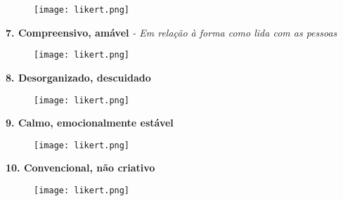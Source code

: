 \begin{figure}[!h]
\texttt{[image: likert.png]}
\end{figure}
 
\noindent
\textbf{7. Compreensivo, amável}       \footnotesize \textsl{- Em relação à forma como lida com as pessoas}\normalsize

\begin{figure}[!h]
\texttt{[image: likert.png]}
\end{figure}

\noindent
\textbf{8. Desorganizado, descuidado}

\begin{figure}[!h]
\texttt{[image: likert.png]}
\end{figure}
 
\noindent
\textbf{9. Calmo, emocionalmente estável}

\begin{figure}[!h]
\texttt{[image: likert.png]}
\end{figure}
 
\noindent
\textbf{10. Convencional, não criativo}  

\begin{figure}[!h]
\texttt{[image: likert.png]}
\end{figure}

